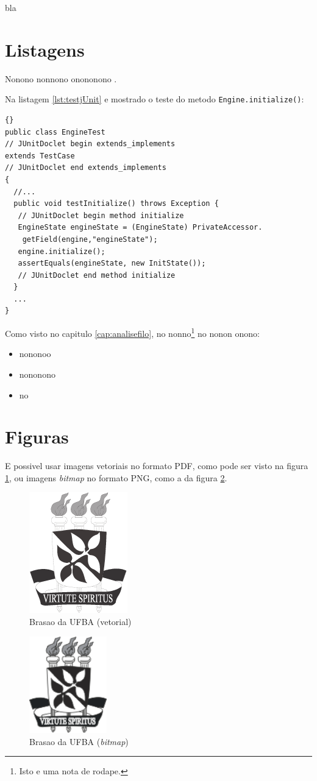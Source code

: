 bla



\section{Listagens} \label{sec:listagens}

Nonono nonnono onononono \cite{fowler2000}.

Na listagem \ref{lst:testjUnit} 
e mostrado o teste do metodo \texttt{Engine.initialize()}:

\lstset{language=java}
\lstset{commentstyle=\textit}
\begin{lstlisting}[frame=trbl, caption=Classe Factory2D,label=lst:testjUnit]{}
public class EngineTest
// JUnitDoclet begin extends_implements
extends TestCase
// JUnitDoclet end extends_implements
{
  //...
  public void testInitialize() throws Exception {
   // JUnitDoclet begin method initialize
   EngineState engineState = (EngineState) PrivateAccessor.
    getField(engine,"engineState");
   engine.initialize();
   assertEquals(engineState, new InitState());
   // JUnitDoclet end method initialize
  }
  ...
}
\end{lstlisting}

Como visto no capitulo \ref{cap:analisefilo}, no nonno\footnote{Isto e uma nota
de rodape.} no nonon onono:
\begin{itemize}
  \item{nononoo}
  \item{nononono}
  \item{no}
\end{itemize}


\section{Figuras} \label{sec:figuras}

E possivel usar imagens vetoriais no \cite{andrade2006} formato PDF, como pode ser visto
na figura \ref{fig:ufba}, ou imagens \emph{bitmap} no formato PNG, como
a da figura \ref{fig:ufba2}.

\begin{figure}
\centering
\includegraphics{brasaoUFBA2}
\caption{Brasao da UFBA (vetorial)}
\label{fig:ufba}
\end{figure}

\begin{figure}
\centering
\includegraphics[width=0.3\textwidth]{brasaoUFBA}
\caption{Brasao da UFBA (\emph{bitmap})}
\label{fig:ufba2}
\end{figure}

